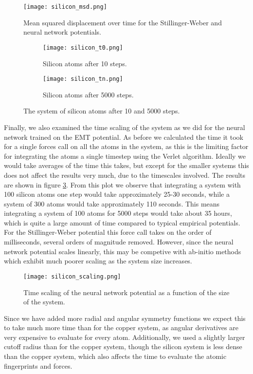 \begin{figure}[H]
    \centering
    \texttt{[image: silicon\_msd.png]}
    \caption{Mean squared displacement over time for the Stillinger-Weber
        and neural network potentials.}
    \label{fig:silicon-msd}
\end{figure}

\begin{figure}[H]
\begin{adjustbox}{max width=1.2\linewidth,center}
\centering
  \begin{subfigure}[b]{0.55\textwidth}
      \texttt{[image: silicon\_t0.png]}
      \caption{Silicon atoms after 10 steps.}
  \end{subfigure}
  \hfill
  \begin{subfigure}[b]{0.55\textwidth}
      \texttt{[image: silicon\_tn.png]}
      \caption{Silicon atoms after 5000 steps.}
  \end{subfigure}
\end{adjustbox}
    \caption{The system of silicon atoms after 10 and 5000 steps.}
    \label{fig:silicon-time}
\end{figure}

Finally, we also examined the time scaling of the system as we did for the
neural network trained on the EMT potential.
As before we calculated the time it took for a single forces call
on all the atoms in the system, as this is the limiting
factor for integrating the atoms a single timestep using the
Verlet algorithm.
Ideally we would take averages of the time this takes, but except
for the smaller systems this does not affect the results very much,
due to the timescales involved.
The results are shown in figure \ref{fig:silicon-scaling}.
From this plot we observe that integrating a system
with 100 silicon atoms one step would take approximately
25-30 seconds, while a system of 300 atoms would take approximately
110 seconds. This means integrating a system of 100 atoms
for 5000 steps would take about 35 hours, which is quite
a large amount of time compared to typical empirical potentials.
For the Stillinger-Weber potential this force call
takes on the order of milliseconds, several orders of magnitude removed.
However, since the neural network potential scales linearly, this may be competive
with ab-initio methods which exhibit much poorer scaling as the system size increases.

\begin{figure}
    \centering
    \texttt{[image: silicon\_scaling.png]}
    \caption{Time scaling of the neural network potential
        as a function of the size of the system.}
    \label{fig:silicon-scaling}
\end{figure}

Since we have added more radial and angular symmetry functions
we expect this to take much more time than for the copper system,
as angular derivatives are very expensive to evaluate for every atom.
Additionally, we used a slightly larger cutoff radius than for the copper system,
though the silicon system is less dense than the copper system, which also
affects the time to evaluate the atomic fingerprints and forces.
